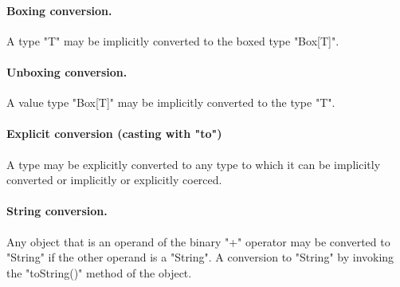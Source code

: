 
\paragraph{Boxing conversion.}
A type \xcd"T" may be implicitly converted to the
boxed type \xcd"Box[T]".


\paragraph{Unboxing conversion.}
A value type \xcd"Box[T]" may be implicitly converted to the
type \xcd"T".


\paragraph{Explicit conversion (casting with \xcd"to")}
A type may be explicitly converted to any type to which it can be
implicitly converted or implicitly or explicitly coerced.


\paragraph{String conversion.}
Any object that is an operand of the binary
\xcd"+" operator may
be converted to \xcd"String" if the other operand is a \xcd"String".
A conversion to \xcd"String" by invoking the \xcd"toString()"
method of the object.


